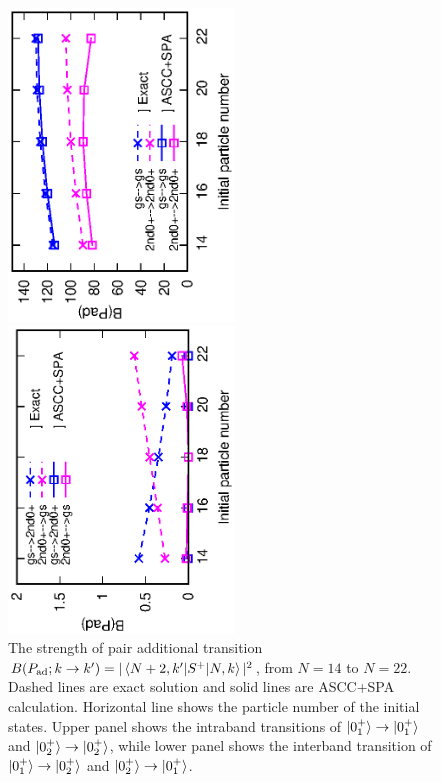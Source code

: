 \documentclass[%
superscriptaddress,
showpacs,
nofootinbib,
amsmath,amssymb,
aps,
prc,
twocolumn,
floatfix ]%
{revtex4-1}
\begin{document}
\begin{figure}[htbp]
 \begin{center}
  \includegraphics[width=60mm,angle=-90]{intra_trans.eps}
 \end{center}
 \begin{center}
  \includegraphics[width=60mm,angle=-90]{inter_trans.eps}
 \end{center}
	\caption{The strength of pair additional transition
$B(P_{\rm ad};k\rightarrow k')=|\braket{N+2,k'|S^+|N,k}|^2$, from $N=14$ to $N=22$. Dashed lines are exact solution and solid lines are ASCC+SPA calculation. Horizontal line shows the particle number of the initial states. Upper panel shows the intraband transitions of
$\ket{0_1^+}\to\ket{0_1^+}$ and $\ket{0_2^+}\to\ket{0_2^+}$,
while lower panel shows the interband transition of
$\ket{0_1^+}\to\ket{0_2^+}$ and $\ket{0_2^+}\to\ket{0_1^+}$.
}
 \label{3levelPad}
\end{figure}
\end{document}
